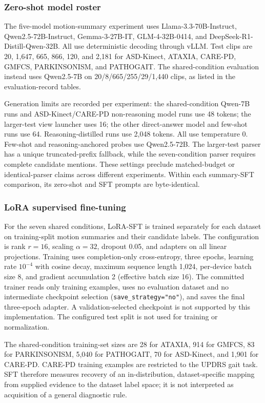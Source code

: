 \subsubsection{Zero-shot model roster}

The five-model motion-summary experiment uses Llama-3.3-70B-Instruct, Qwen2.5-72B-Instruct, Gemma-3-27B-IT, GLM-4-32B-0414, and DeepSeek-R1-Distill-Qwen-32B. All use deterministic decoding through vLLM. Test clips are 20, 1,647, 665, 866, 120, and 2,181 for ASD-Kinect, ATAXIA, CARE-PD, GMFCS, PARKINSONISM, and PATHOGAIT. The shared-condition evaluation instead uses Qwen2.5-7B on 20/8/665/255/29/1,440 clips, as listed in the evaluation-record tables.

Generation limits are recorded per experiment: the shared-condition Qwen-7B runs and ASD-Kinect/CARE-PD non-reasoning model runs use 48 tokens; the larger-test view launcher uses 16; the other direct-answer model and few-shot runs use 64. Reasoning-distilled runs use 2,048 tokens. All use temperature 0. Few-shot and reasoning-anchored probes use Qwen2.5-72B. The larger-test parser has a unique truncated-prefix fallback, while the seven-condition parser requires complete candidate mentions. These settings preclude matched-budget or identical-parser claims across different experiments. Within each summary-SFT comparison, its zero-shot and SFT prompts are byte-identical.

\subsubsection{LoRA supervised fine-tuning}

For the seven shared conditions, LoRA-SFT is trained separately for each dataset on training-split motion summaries and their candidate labels. The configuration is rank $r=16$, scaling $\alpha=32$, dropout 0.05, and adapters on all linear projections. Training uses completion-only cross-entropy, three epochs, learning rate $10^{-4}$ with cosine decay, maximum sequence length 1,024, per-device batch size 8, and gradient accumulation 2 (effective batch size 16). The committed trainer reads only training examples, uses no evaluation dataset and no intermediate checkpoint selection (\texttt{save\_strategy="no"}), and saves the final three-epoch adapter. A validation-selected checkpoint is not supported by this implementation. The configured test split is not used for training or normalization.

The shared-condition training-set sizes are 28 for ATAXIA, 914 for GMFCS, 83 for PARKINSONISM, 5,040 for PATHOGAIT, 70 for ASD-Kinect, and 1,901 for CARE-PD. CARE-PD training examples are restricted to the UPDRS gait task. SFT therefore measures recovery of an in-distribution, dataset-specific mapping from supplied evidence to the dataset label space; it is not interpreted as acquisition of a general diagnostic rule.

